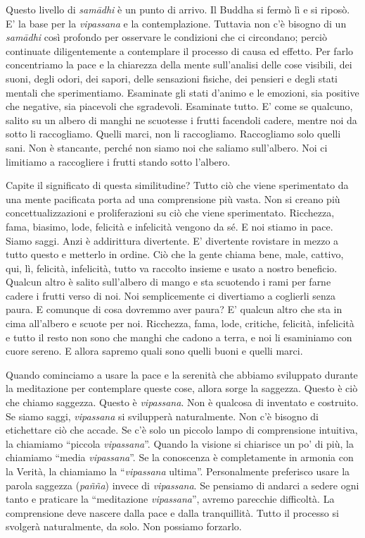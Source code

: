 Questo livello di \emph{samādhi} è un punto di arrivo. Il Buddha si fermò lì e
si riposò. E' la base per la \emph{vipassana} e la contemplazione. Tuttavia non
c'è bisogno di un \emph{samādhi} così profondo per osservare le condizioni che
ci circondano; perciò continuate diligentemente a contemplare il
processo di causa ed effetto. Per farlo concentriamo la pace e la
chiarezza della mente sull'analisi delle cose visibili, dei suoni, degli
odori, dei sapori, delle sensazioni fisiche, dei pensieri e degli stati
mentali che sperimentiamo. Esaminate gli stati d'animo e le emozioni,
sia positive che negative, sia piacevoli che sgradevoli. Esaminate
tutto. E' come se qualcuno, salito su un albero di manghi ne scuotesse i
frutti facendoli cadere, mentre noi da sotto li raccogliamo. Quelli
marci, non li raccogliamo. Raccogliamo solo quelli sani. Non è
stancante, perché non siamo noi che saliamo sull'albero. Noi ci
limitiamo a raccogliere i frutti stando sotto l'albero.

Capite il significato di questa similitudine? Tutto ciò che viene
sperimentato da una mente pacificata porta ad una comprensione più
vasta. Non si creano più concettualizzazioni e proliferazioni su ciò che
viene sperimentato. Ricchezza, fama, biasimo, lode, felicità e
infelicità vengono da sé. E noi stiamo in pace. Siamo saggi. Anzi è
addirittura divertente. E' divertente rovistare in mezzo a tutto questo
e metterlo in ordine. Ciò che la gente chiama bene, male, cattivo, qui,
lì, felicità, infelicità, tutto va raccolto insieme e usato a nostro
beneficio. Qualcun altro è salito sull'albero di mango e sta scuotendo i
rami per farne cadere i frutti verso di noi. Noi semplicemente ci
divertiamo a coglierli senza paura. E comunque di cosa dovremmo aver
paura? E' qualcun altro che sta in cima all'albero e scuote per noi.
Ricchezza, fama, lode, critiche, felicità, infelicità e tutto il resto
non sono che manghi che cadono a terra, e noi li esaminiamo con cuore
sereno. E allora sapremo quali sono quelli buoni e quelli marci.


Quando cominciamo a usare la pace e la serenità che abbiamo sviluppato
durante la meditazione per contemplare queste cose, allora sorge la
saggezza. Questo è ciò che chiamo saggezza. Questo è \emph{vipassana}. Non è
qualcosa di inventato e costruito. Se siamo saggi, \emph{vipassana} si
svilupperà naturalmente. Non c'è bisogno di etichettare ciò che accade.
Se c'è solo un piccolo lampo di comprensione intuitiva, la chiamiamo
``piccola \emph{vipassana}''. Quando la visione si chiarisce un po' di più, la
chiamiamo ``media \emph{vipassana}''. Se la conoscenza è completamente in
armonia con la Verità, la chiamiamo la ``\emph{vipassana} ultima''.
Personalmente preferisco usare la parola saggezza (\emph{pañña}) invece
di \emph{vipassana}. Se pensiamo di andarci a sedere ogni tanto e praticare la
``meditazione \emph{vipassana}'', avremo parecchie difficoltà. La comprensione
deve nascere dalla pace e dalla tranquillità. Tutto il processo si
svolgerà naturalmente, da solo. Non possiamo forzarlo.

